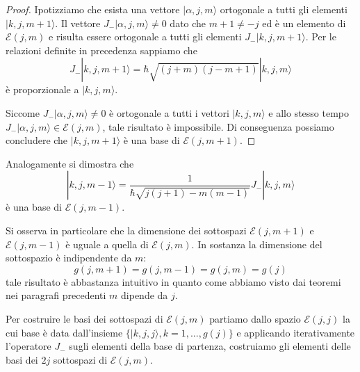 \begin{proof}
	Ipotizziamo che esista una vettore $|\alpha,j,m \rangle $ ortogonale a tutti gli elementi $|k,j,m+1 \rangle $. Il vettore $J_-|\alpha,j,m \rangle \neq 0$ dato che $m+1 \neq -j$ ed \`e un elemento di $\mathcal{E}(j,m)$ e risulta essere ortogonale a tutti gli elementi $J_-|k,j,m+1 \rangle $. Per le relazioni definite in precedenza sappiamo che
	\begin{equation*}
		J_-|k,j,m+1 \rangle = \hbar \sqrt{(j+m)(j-m+1)}|k,j,m \rangle 
	\end{equation*}
\`e proporzionale a $|k,j,m\rangle$.

Siccome $J_-|\alpha,j,m \rangle \neq 0$ \`e ortogonale a tutti i vettori $|k,j,m \rangle $ e allo stesso tempo $J_-|\alpha,j,m \rangle \in \mathcal{E}(j,m)$, tale risultato \`e impossibile. Di conseguenza possiamo concludere che $|k,j,m+1 \rangle $ \`e una base di $\mathcal{E}(j,m+1)$.

\end{proof}
Analogamente si dimostra che 
\begin{equation}
|k, j, m-1\rangle=\frac{1}{\hbar \sqrt{j(j+1)-m(m-1)}} J_{-}|k, j, m\rangle
\end{equation}
\`e una base di $\mathcal{E}(j,m-1)$.

Si osserva in particolare che la dimensione dei sottospazi $\mathcal{E}(j,m+1)$ e $\mathcal{E}(j,m-1)$ \`e uguale a quella di $\mathcal{E}(j,m)$. In sostanza la dimensione del sottospazio \`e indipendente da $m$:
\begin{equation*}
	g(j, m+1)=g(j, m-1)=g(j, m)=g(j)
\end{equation*}
tale risultato \`e abbastanza intuitivo in quanto come abbiamo visto dai teoremi nei paragrafi precedenti $m$ dipende da $j$.

Per costruire le basi dei sottospazi di $\mathcal{E}(j,m)$ partiamo dallo spazio $\mathcal{E}(j,j)$ la cui base \`e data dall'insieme $\{|k,j,j \rangle , k =1,...,g(j) \}$ e applicando iterativamente l'operatore $J_-$ sugli elementi della base di partenza, costruiamo gli elementi delle basi dei $2j$ sottospazi di $\mathcal{E}(j,m)$.

 \vspace{1cm}
\newpage

